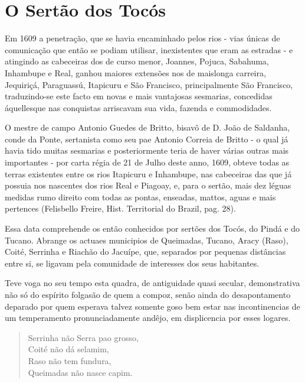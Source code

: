 \chapter{O Sertão dos Tocós}

 Em 1609 a penetração, que se havia encaminhado pelos rios - vias únicas de comunicação que então se podiam utilisar, inexistentes que eram as estradas - e atingindo as cabeceiras dos de curso menor, Joannes, Pojuca, Sabahuma, Inhambupe e Real, ganhou maiores extensões nos de maislonga carreira, Jequiriçá, Paraguassú, Itapicuru e São Francisco, principalmente São Francisco, traduzindo-se este facto em novas e mais vantajosas sesmarias, concedidas áquellesque nas conquistas arriscavam sua vida, fazenda e commodidades.
 
 O mestre de campo Antonio Guedes de Britto, bisavô  de  D. João de Saldanha, conde da Ponte, sertanista como seu pae Antonio Correia de Britto - o qual já havia tido muitas sesmarias e posteriormente  teria de haver várias outras mais importantes - por carta régia de 21 de Julho deste anno, 1609, obteve todas as terras existentes entre os rios Itapicuru e Inhambupe, nas cabeceiras das que já possuia nos nascentes dos rios Real  e Piagoay, e, para o sertão, mais dez léguas  medidas rumo direito com todas as pontas, enseadas, mattos, aguas e mais pertences (Felisbello Freire, Hist. Territorial do Brazil, pag. 28).
 
 Essa data  comprehende os então conhecidos por sertões dos Tocós, do Pindá  e do Tucano. Abrange os actuaes municipios de Queimadas, Tucano, Aracy (Raso), Coité, Serrinha e Riachão do Jacuípe, que, separados por pequenas distâncias entre si, se ligavam pela comunidade de interesses dos seus habitantes.
 
 Teve voga no seu tempo esta quadra, de antiguidade quasi secular, demonstrativa não só do espírito folgasão  de quem a compoz, senão ainda do desapontamento deparado  por quem esperava talvez somente goso bem estar nas incontinencias de um temperamento pronunciadamente andêjo, em displicencia por esses logares.
 \begin{verse}
 	\hspace{4em}Serrinha não Serra pao grosso,\\
 	\hspace{4em}Coité não dá selamim,\\
 	\hspace{4em}Raso não tem fundura,\\
	\hspace{4em}Queimadas não nasce capim.\\
 \end{verse}

